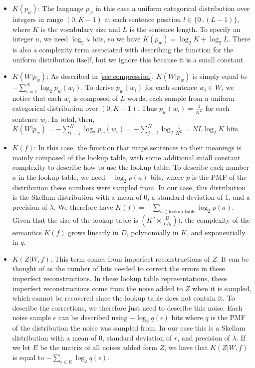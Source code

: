 \documentclass{article}
\begin{document}
\begin{appendices}
\begin{itemize}
    \item $K(p_w)$: The language $p_w$ in this case a uniform categorical distribution over integers in range $(0, K-1)$ at each sentence position $l \in \{0..(L-1)\}$, where $K$ is the vocabulary size and $L$ is the sentence length. To specify an integer $u$, we need $\log_2 u$ bits, so we have $K(p_w) = \log_2 K + \log_2 L$. There is also a complexity term associated with describing the function for the uniform distribution itself, but we ignore this because it is a small constant.
    
    \item $K(W|p_w)$: As described in \cref{sec:compression}, $K(W|p_w)$ is simply equal to $-\sum_{i=1}^{N} \log_2 p_w(w_i)$. To derive $p_w(w_i)$ for each sentence $w_i \in W$, we notice that each $w_i$ is composed of $L$ words, each sample from a uniform categorical distribution over $(0, K-1)$. Thus $p_w(w_i) = \frac{1}{K^L}$ for each sentence $w_i$. In total, then, $K(W|p_w) = -\sum_{i=1}^N \log_2 p_w(w_i) = -\sum_{j=i}^N \log_2 \frac{1}{K^L} = NL\log_2 K$ bits.
    
    \item $K(f)$: In this case, the function that maps sentences to their meanings is mainly composed of the lookup table, with some additional small constant complexity to describe how to use the lookup table. To describe each number $a$ in the lookup table, we need $-\log_2 p(a)$ bits, where $p$ is the PMF of the distribution these numbers were sampled from. In our case, this distribution is the Skellam distribution with a mean of 0, a standard deviation of 1, and a precision of $\lambda$. We therefore have $K(f) = -\sum_{a \in \text{lookup table}} \log_2 p(a)$. Given that the size of the lookup table is $(K^q \times \frac{D}{L / q}))$, the complexity of the semantics $K(f)$ grows linearly in $D$, polynomially in $K$, and exponentially in $q$.
    
    \item $K(Z|W,f)$: This term comes from imperfect reconstructions of $Z$. It can be thought of as the number of bits needed to correct the errors in these imperfect reconstructions. In these lookup table representations, these imperfect reconstructions come from the noise added to $Z$ when it is sampled, which cannot be recovered since the lookup table does not contain it. To describe the corrections, we therefore just need to describe this noise. Each noise sample $\epsilon$ can be described using $-\log_2 q(\epsilon)$ bits where $q$ is the PMF of the distribution the noise was sampled from. In our case this is a Skellam distribution with a mean of 0, standard deviation of $r$, and precision of $\lambda$. If we let $E$ be the matrix of all noises added form $Z$, we have that $K(Z|W,f)$ is equal to $-\sum_{\epsilon \in E} \log_2 q(\epsilon)$.
\end{itemize}


\end{appendices}
\end{document}

